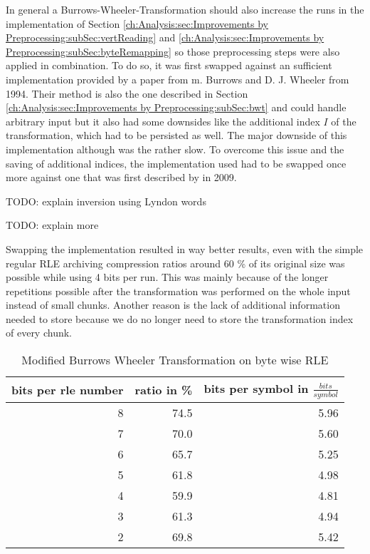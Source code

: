 \par{
In general a Burrows-Wheeler-Transformation should also increase the runs in the implementation of Section \ref{ch:Analysis:sec:Improvements by Preprocessing:subSec:vertReading} and \ref{ch:Analysis:sec:Improvements by Preprocessing:subSec:byteRemapping} so those preprocessing steps were also applied in combination. To do so, it was first swapped against an sufficient implementation provided by a paper from m. Burrows and D. J. Wheeler \cite{Burrows94} from 1994. Their method is also the one described in Section \ref{ch:Analysis:sec:Improvements by Preprocessing:subSec:bwt} and could handle arbitrary input but it also had some downsides like the additional index $I$ of the transformation, which had to be persisted as well. The major downside of this implementation although was the rather slow. To overcome this issue and the saving of additional indices, the implementation used had to be swapped once more against one that was first described by \cite{Burrows-linear-time} in 2009.

TODO: explain inversion using Lyndon words
}
\par{
	TODO: explain more
	
	
Swapping the implementation resulted in way better results, even with the simple regular RLE archiving compression ratios around 60 \% of its original size was possible while using 4 bits per run. This was mainly because of the longer repetitions possible after the transformation was performed on the whole input instead of small chunks. Another reason is the lack of additional information needed to store because we do no longer need to store the transformation index of every chunk.
	\begin{table}[H]
		\centering
		\begin{tabular}{r|r|r}	
			bits per rle number & ratio in \% & bits per symbol in $\frac{bits}{symbol}$\\
			\hline
			8 & 74.5 & 5.96\\
			7 & 70.0 & 5.60\\
			6 & 65.7 & 5.25\\
			5 & 61.8 & 4.98\\
			4 & 59.9 & 4.81\\
			3 & 61.3 & 4.94\\
			2 & 69.8 & 5.42
		\end{tabular}
		\caption{Modified Burrows Wheeler Transformation on byte wise RLE}
		\label{tab:t12 Modified Burrows Wheeler Transformation on byte wise RLE}
	\end{table}
}



